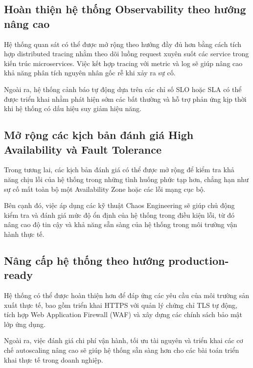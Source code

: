 \subsection{Hoàn thiện hệ thống Observability theo hướng nâng cao}

Hệ thống quan sát có thể được mở rộng theo hướng đầy đủ hơn bằng cách tích hợp
distributed tracing nhằm theo dõi luồng request xuyên suốt các service trong
kiến trúc microservices. Việc kết hợp tracing với metric và log sẽ giúp nâng cao
khả năng phân tích nguyên nhân gốc rễ khi xảy ra sự cố.

Ngoài ra, hệ thống cảnh báo tự động dựa trên các chỉ số SLO hoặc SLA có thể được
triển khai nhằm phát hiện sớm các bất thường và hỗ trợ phản ứng kịp thời khi hệ
thống có dấu hiệu suy giảm hiệu năng.

\subsection{Mở rộng các kịch bản đánh giá High Availability và Fault Tolerance}

Trong tương lai, các kịch bản đánh giá có thể được mở rộng để kiểm tra khả năng
chịu lỗi của hệ thống trong những tình huống phức tạp hơn, chẳng hạn như sự cố
mất toàn bộ một Availability Zone hoặc các lỗi mạng cục bộ.

Bên cạnh đó, việc áp dụng các kỹ thuật Chaos Engineering sẽ giúp chủ động kiểm
tra và đánh giá mức độ ổn định của hệ thống trong điều kiện lỗi, từ đó nâng cao
độ tin cậy và khả năng sẵn sàng của hệ thống trong môi trường vận hành thực tế.

\subsection{Nâng cấp hệ thống theo hướng production-ready}

Hệ thống có thể được hoàn thiện hơn để đáp ứng các yêu cầu của môi trường sản
xuất thực tế, bao gồm triển khai HTTPS với quản lý chứng chỉ TLS tự động, tích
hợp Web Application Firewall (WAF) và xây dựng các chính sách bảo mật lớp ứng
dụng.

Ngoài ra, việc đánh giá chi phí vận hành, tối ưu tài nguyên và triển khai các
cơ chế autoscaling nâng cao sẽ giúp hệ thống sẵn sàng hơn cho các bài toán
triển khai thực tế trong doanh nghiệp.
